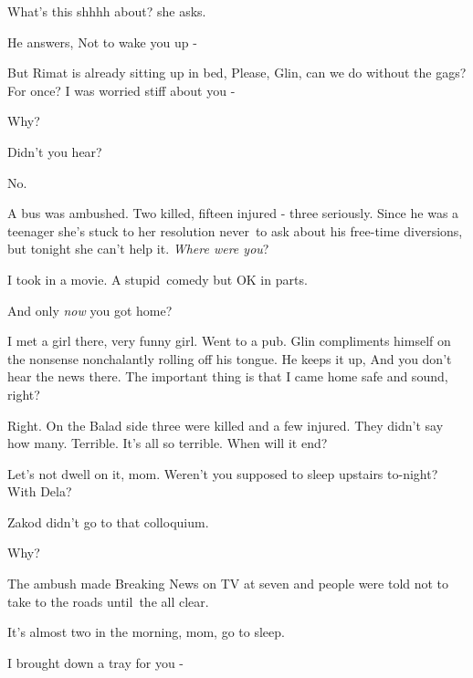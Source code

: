 \documentclass[letterpaper]{article}
\begin{document}
{\textquotedbl}What{}'s this shhhh about?{\textquotedbl} she asks.

He answers, {\textquotedbl}Not to wake you up -{\textquotedbl} 

But Rimat is already sitting up in bed, {\textquotedbl}Please, Glin, can we do without the gags? For once? I was worried
stiff about you -{\textquotedbl} 

{\textquotedbl}Why?{\textquotedbl} 

{\textquotedbl}Didn't you hear?{\textquotedbl} 

{\textquotedbl}No.{\textquotedbl} 

{\textquotedbl}A bus was ambushed. Two killed, fifteen injured - three seriously.{\textquotedbl} Since he was a teenager
she's stuck to her resolution never\textcolor[rgb]{0.0,0.4392157,0.7529412}{\ }to ask about his
free\textcolor[rgb]{0.0,0.4392157,0.7529412}{{}-}time diversions, but tonight she can't help it.
{\textquotedbl}\textit{Where were you}?{\textquotedbl} 

{\textquotedbl}I took in a movie. A stupid\textcolor[rgb]{0.0,0.4392157,0.7529412}{\ }comedy but OK in
parts.{\textquotedbl} 

{\textquotedbl}And only \textit{now} you got home?{\textquotedbl} ~

{\textquotedbl}I met a girl there, very funny girl. Went to a pub.{\textquotedbl} Glin compliments himself on the
nonsense nonchalantly rolling off his tongue. He keeps it up, {\textquotedbl}And you don't hear the news there. The
important thing is that I came home safe and sound, right?{\textquotedbl} 

{\textquotedbl}Right. On the Balad side three were killed and a few injured. They didn't say how many. Terrible. It's
all so terrible. When will it end?{\textquotedbl} 

{\textquotedbl}Let's not dwell on it, mom. Weren't you supposed to sleep upstairs to-night? With Dela?{\textquotedbl} 

{\textquotedbl}Zakod didn't go to that colloquium.{\textquotedbl} 

{\textquotedbl}Why?{\textquotedbl} 

{\textquotedbl}The ambush made Breaking News on TV at seven and people were told not to take to the roads until~the all
clear.{\textquotedbl} 

{\textquotedbl}It's almost two in the morning, mom, go to sleep.{\textquotedbl} 

{\textquotedbl}I brought down a tray for you -{\textquotedbl} 
\end{document}
